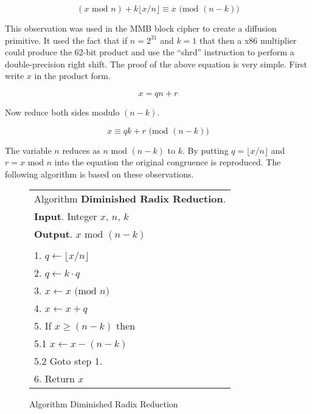 \documentclass[b5paper]{book}
\begin{document}
\begin{equation}
(x \mbox{ mod } n) + k \lfloor x / n \rfloor \equiv x \mbox{ (mod }(n - k)\mbox{)}
\end{equation}

This observation was used in the MMB \cite{MMB} block cipher to create a diffusion primitive.  It used the fact that if $n = 2^{31}$ and $k=1$ that 
then a x86 multiplier could produce the 62-bit product and use  the ``shrd'' instruction to perform a double-precision right shift.  The proof
of the above equation is very simple.  First write $x$ in the product form.

\begin{equation}
x = qn + r
\end{equation}

Now reduce both sides modulo $(n - k)$.

\begin{equation}
x \equiv qk + r  \mbox{ (mod }(n-k)\mbox{)}
\end{equation}

The variable $n$ reduces as $n \mbox{ mod } (n - k)$ to $k$.  By putting $q = \lfloor x/n \rfloor$ and $r = x \mbox{ mod } n$ 
into the equation the original congruence is reproduced.  The following algorithm is based on these observations.

\begin{figure}[!here]
\begin{small}
\begin{center}
\begin{tabular}{l}
\hline Algorithm \textbf{Diminished Radix Reduction}. \\
\textbf{Input}.   Integer $x$, $n$, $k$ \\
\textbf{Output}.  $x \mbox{ mod } (n - k)$ \\
\hline \\
1.  $q \leftarrow \lfloor x / n \rfloor$ \\
2.  $q \leftarrow k \cdot q$ \\
3.  $x \leftarrow x \mbox{ (mod }n\mbox{)}$ \\
4.  $x \leftarrow x + q$ \\
5.  If $x \ge (n - k)$ then \\
\hspace{3mm}5.1  $x \leftarrow x - (n - k)$ \\
\hspace{3mm}5.2  Goto step 1. \\
6.  Return $x$ \\
\hline
\end{tabular}
\end{center}
\end{small}
\caption{Algorithm Diminished Radix Reduction}
\label{fig:DR}
\end{figure}
\end{document}

